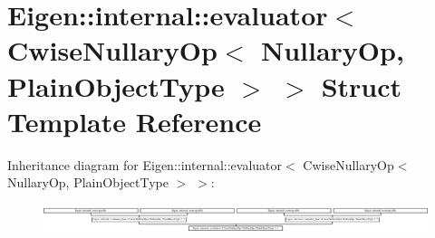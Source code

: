 \hypertarget{struct_eigen_1_1internal_1_1evaluator_3_01_cwise_nullary_op_3_01_nullary_op_00_01_plain_object_type_01_4_01_4}{}\section{Eigen\+:\+:internal\+:\+:evaluator$<$ Cwise\+Nullary\+Op$<$ Nullary\+Op, Plain\+Object\+Type $>$ $>$ Struct Template Reference}
\label{struct_eigen_1_1internal_1_1evaluator_3_01_cwise_nullary_op_3_01_nullary_op_00_01_plain_object_type_01_4_01_4}
Inheritance diagram for Eigen\+:\+:internal\+:\+:evaluator$<$ Cwise\+Nullary\+Op$<$ Nullary\+Op, Plain\+Object\+Type $>$ $>$\+:\begin{figure}[H]
\begin{center}
\leavevmode
\includegraphics[height=0.851927cm]{struct_eigen_1_1internal_1_1evaluator_3_01_cwise_nullary_op_3_01_nullary_op_00_01_plain_object_type_01_4_01_4}
\end{center}
\end{figure}
